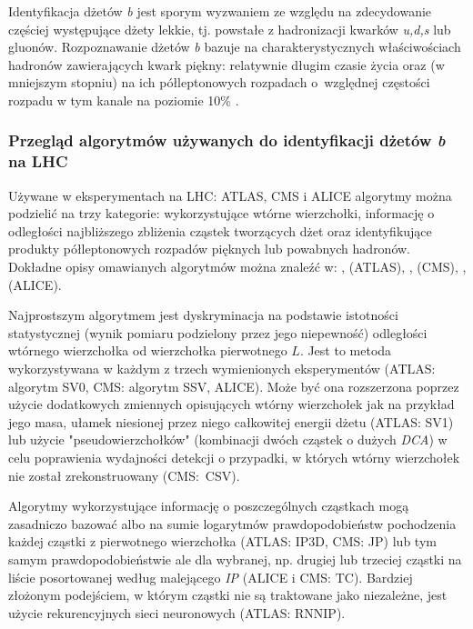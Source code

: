 Identyfikacja dżetów \textit{b} jest sporym wyzwaniem ze względu na zdecydowanie częściej występujące dżety lekkie, tj. powstałe z hadronizacji kwarków \textit{u,d,s} lub gluonów.
Rozpoznawanie dżetów \textit{b} bazuje na charakterystycznych właściwościach hadronów zawierających kwark piękny: relatywnie długim czasie życia oraz (w mniejszym stopniu) na ich półleptonowych rozpadach o~względnej częstości rozpadu w tym kanale  na poziomie 10\% \cite{Patrignani:2016xqp}.

\subsubsection{Przegląd algorytmów używanych do identyfikacji dżetów \textit{b} na LHC} 
\label{subsubsec:przeglad-algo}
Używane w eksperymentach na LHC: ATLAS, CMS i ALICE algorytmy można podzielić na trzy kategorie: wykorzystujące wtórne wierzchołki, informację o odległości najbliższego zbliżenia cząstek tworzących dżet  oraz identyfikujące produkty półleptonowych rozpadów pięknych lub powabnych hadronów. Dokładne opisy omawianych algorytmów można znaleźć w: \cite{Aad:2015ydr}, \cite{Aaboud:2018xwy} (ATLAS), \cite{Chatrchyan:2012jua}, \cite{Sirunyan:2017ezt} (CMS), \cite{Feldkamp:2013cya}, \cite{Haake:2017dpr} (ALICE).

Najprostszym algorytmem jest dyskryminacja na podstawie istotności statystycznej (wynik pomiaru podzielony przez jego niepewność) odległości wtórnego wierzchołka od wierzchołka pierwotnego $L$. Jest to metoda wykorzystywana w  każdym z trzech wymienionych eksperymentów (ATLAS: algorytm SV0, CMS: algorytm SSV, ALICE). 
Może być ona rozszerzona poprzez użycie dodatkowych zmiennych opisujących wtórny wierzchołek jak na przykład jego masa, ułamek niesionej przez niego całkowitej energii dżetu (ATLAS: SV1) lub użycie "pseudowierzchołków" (kombinacji dwóch cząstek o dużych \textit{DCA}) w celu poprawienia wydajności detekcji o przypadki, w których wtórny wierzchołek nie został zrekonstruowany (CMS:~CSV).

Algorytmy wykorzystujące informację o poszczególnych cząstkach mogą zasadniczo bazować albo na sumie logarytmów prawdopodobieństw pochodzenia każdej cząstki z pierwotnego wierzchołka (ATLAS: IP3D, CMS: JP) lub tym samym prawdopodobieństwie ale dla wybranej, np. drugiej lub trzeciej cząstki na liście posortowanej według malejącego \textit{IP} (ALICE i CMS: TC). Bardziej złożonym podejściem, w którym cząstki nie są traktowane jako niezależne, jest użycie rekurencyjnych sieci neuronowych (ATLAS: RNNIP).

